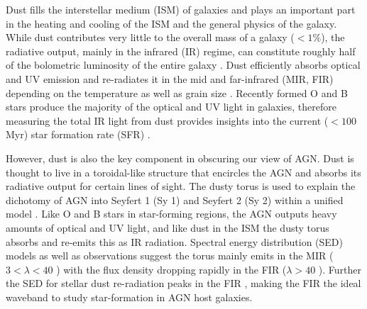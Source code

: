 Dust fills the interstellar medium (ISM) of galaxies and plays an important part in the heating and cooling of the ISM and the general physics of the galaxy. While dust contributes very little to the overall mass of a galaxy ($<1\%$), the radiative output, mainly in the infrared (IR) regime, can constitute roughly half of the bolometric luminosity of the entire galaxy \citep{Hauser_2001,Boselli_2003,Dale:2007fk,Burgarella_2013}. Dust efficiently absorbs optical and UV emission and re-radiates it in the mid and far-infrared (MIR, FIR) depending on the temperature as well as grain size \citep{Draine:2003gd}. Recently formed O and B stars produce the majority of the optical and UV light in galaxies, therefore measuring the total IR light from dust provides insights into the current ($<100$ Myr) star formation rate (SFR) \citep[e.g.][]{Kennicutt:2012it}.

However, dust is also the key component in obscuring our view of AGN. Dust is thought to live in a toroidal-like structure that encircles the AGN and absorbs its radiative output for certain lines of sight. The dusty torus is used to explain the dichotomy of AGN into Seyfert 1 (Sy 1) and Seyfert 2 (Sy 2) within a unified model \citep{Antonucci:1993os,Urry:1995il}. Like O and B stars in star-forming regions, the AGN outputs heavy amounts of optical and UV light, and like dust in the ISM the dusty torus absorbs and re-emits this as IR radiation. Spectral energy distribution (SED) models \citep{Barvainis:1987ty, Pier:1992sf, Efstathiou:1995rz, Nenkova:2002ys, Fritz:2006yq}  as well as observations \citep{Elvis:1994uq, Spinoglio:2002uq, Netzer:2007ve, Mullaney:2011yq, Mor:2012fj} suggest the torus mainly emits in the MIR ($3<\lambda<40$ \um) with the flux density dropping rapidly in the FIR ($\lambda>40$ \um). Further the SED for stellar dust re-radiation peaks in the FIR \citep{Calzetti:2000fk, Dale:2002ty, Draine:2007rm}, making the FIR the ideal waveband to study star-formation in AGN host galaxies.

